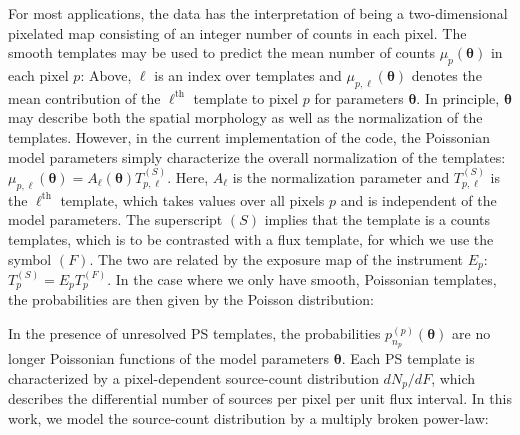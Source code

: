 For most applications, the data has the interpretation of being a two-dimensional pixelated map consisting of an integer number of counts in each pixel.  The smooth templates may be used to predict the mean number of counts $\mu_p({\bm \theta})$ in each pixel $p$:   
Above, $\ell$ is an index over templates and $\mu_{p, \ell} ({\bm \theta})$ denotes the mean contribution of the $\ell^\text{th}$ template to pixel $p$ for parameters ${\bm \theta}$.  In principle, ${\bm \theta}$ may describe both the spatial morphology as well as the normalization of the templates.  However, in the current implementation of the code, the Poissonian model parameters simply characterize the overall normalization of the templates: $\mu_{p, \ell} ({\bm \theta}) = A_{\ell}( {\bm \theta}) T^{(S)}_{p,\ell}$.  Here, $A_{\ell}$ is the normalization parameter and $T^{(S)}_{p,\ell}$ is the $\ell^\text{th}$ template, which takes values over all pixels $p$ and is independent of the model parameters.  The superscript $(S)$ implies that the template is a counts templates, which is to be contrasted with a flux template, for which we use the symbol $(F)$. The two are related by the exposure map of the instrument $E_{p}$: $T^{(S)}_p = E_p T^{(F)}_p$. In the case where we only have smooth, Poissonian templates, the probabilities are then given by the Poisson distribution:

In the presence of unresolved PS templates, the probabilities $p_{n_p}^{(p)}({\bm \theta})$ are no longer Poissonian functions of the model parameters ${\bm \theta}$.  Each PS template is characterized by a pixel-dependent source-count distribution $dN_p/dF$, which describes the differential number of sources per pixel per unit flux interval.  In this work, we model the source-count distribution by a multiply broken power-law:  


